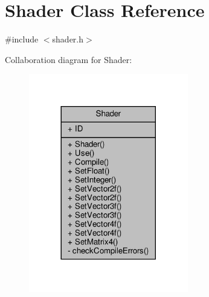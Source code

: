 \hypertarget{classShader}{}\section{Shader Class Reference}
\label{classShader}


{\ttfamily \#include $<$shader.\+h$>$}



Collaboration diagram for Shader\+:
\nopagebreak
\begin{figure}[H]
\begin{center}
\leavevmode
\includegraphics[width=197pt]{classShader__coll__graph}
\end{center}
\end{figure}
